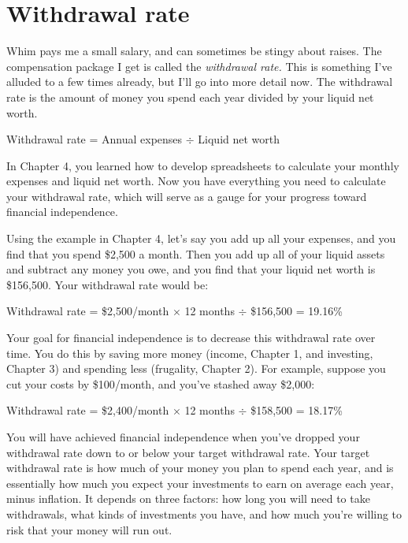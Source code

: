 \section{Withdrawal rate}
Whim pays me a small salary, and can sometimes be stingy about raises. The compensation package I get is called the \emph{withdrawal rate.} This is something I've alluded to a few times already, but I'll go into more detail now. The withdrawal rate is the amount of money you spend each year divided by your liquid net worth.

\begin{center}
Withdrawal rate = Annual expenses $\div$ Liquid net worth
\end{center}

In Chapter 4, you learned how to develop spreadsheets to calculate your monthly expenses and liquid net worth. Now you have everything you need to calculate your withdrawal rate, which will serve as a gauge for your progress toward financial independence.

Using the example in Chapter 4, let's say you add up all your expenses, and you find that you spend \$2,500 a month. Then you add up all of your liquid assets and subtract any money you owe, and you find that your liquid net worth is \$156,500. Your withdrawal rate would be:

\begin{center}
Withdrawal rate = \$2,500/month $\times$ 12 months $\div$ \$156,500 = 19.16\%
\end{center}

Your goal for financial independence is to decrease this withdrawal rate over time. You do this by saving more money (income, Chapter 1, and investing, Chapter 3) and spending less (frugality, Chapter 2). For example, suppose you cut your costs by \$100/month, and you've stashed away \$2,000:

\begin{center}
Withdrawal rate = \$2,400/month $\times$ 12 months $\div$ \$158,500 = 18.17\%
\end{center}

You will have achieved financial independence when you've dropped your withdrawal rate down to or below your target withdrawal rate. Your target withdrawal rate is how much of your money you plan to spend each year, and is essentially how much you expect your investments to earn on average each year, minus inflation. It depends on three factors: how long you will need to take withdrawals, what kinds of investments you have, and how much you're willing to risk that your money will run out.

